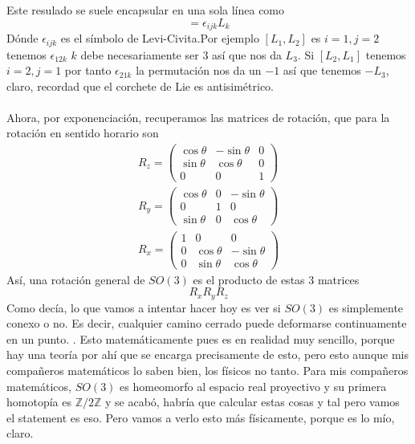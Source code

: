 \documentclass[12pt]{article}
\begin{document}
Este resulado se suele encapsular en una sola línea como
\begin{equation}
    [L_i, L_j]=\epsilon_{ijk}L_k
\end{equation}
Dónde $\epsilon_{ijk}$ es el símbolo de Levi-Civita.Por ejemplo $[L_1,L_2]$ es $i=1, j=2$ tenemos $\epsilon_{12k}$ $k$ debe necesariamente ser $3$ así que nos da $L_3$. Si $[L_2,L_1]$ tenemos $i=2, j=1$ por tanto $\epsilon_{21k}$ la permutación nos da un $-1$ así que tenemos $-L_3$, claro, recordad que el corchete de Lie es antisimétrico. \\\\
Ahora, por exponenciación, recuperamos las matrices de rotación, que para la rotación en sentido horario son
\begin{equation}
    \begin{split}
        R_z= \begin{pmatrix}
            \cos \theta & -\sin\theta& 0 \\ 
            \sin \theta & \cos \theta &0 \\
            0 &0 & 1 
        \end{pmatrix} \\
        R_y = \begin{pmatrix}
            \cos\theta & 0 &-\sin\theta \\
            0 & 1 & 0\\
            \sin \theta &0 & \cos\theta
        \end{pmatrix}\\
        R_x =\begin{pmatrix}
            1 & 0 &0   \\
            0 & \cos\theta & -\sin\theta \\
            0& \sin\theta & \cos\theta 
        \end{pmatrix}
    \end{split}
\end{equation}
Así, una rotación general de $SO(3)$ es el producto de estas 3 matrices
\begin{equation}
    R_xR_yR_z
\end{equation}
Como decía, lo que vamos a intentar hacer hoy es ver si $SO(3)$ es simplemente conexo o no. Es decir, cualquier camino cerrado puede deformarse continuamente en un punto. . Esto matemáticamente pues es en realidad muy sencillo, porque hay una teoría por ahí que se encarga precisamente de esto, pero esto aunque mis compañeros matemáticos lo saben bien, los físicos no tanto. Para mis compañeros matemáticos, $SO(3)$  es homeomorfo al espacio real proyectivo y su primera homotopía es $\mathbb{Z}/2\mathbb{Z}$  y se acabó, habría que calcular estas cosas y tal pero vamos el statement es eso. Pero vamos a verlo esto más físicamente, porque es lo mío, claro.
\end{document}
